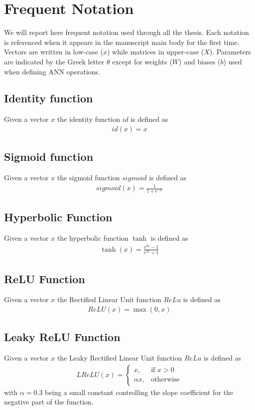 \chapter{Frequent Notation}

We will report here frequent notation used through all the thesis. Each notation is referenced when it appears in the manuscript main body for the first time. Vectors are written in low-case ($x$) while matrices in upper-case ($X$). Parameters are indicated by the Greek letter $\theta$ except for weights ($W$) and biases ($b$) used when defining ANN operations.

\section{Identity function}
Given a vector $x$ the identity function $id$ is defined as 
\begin{gather}
    \label{identity}
    id(x) = x
\end{gather}

\section{Sigmoid function}
Given a vector $x$ the sigmoid function $sigmoid$ is defined as 
\begin{gather}
    \label{sigmoid}
    sigmoid(x) = \frac {1} {1 + e^{-x}}
\end{gather}

\section{Hyperbolic Function}
Given a vector $x$ the hyperbolic function $\tanh$ is defined as 
\begin{gather}
    \label{tanh}
    \tanh(x) = \frac {e^{2x} -1} {e^{2x} +1}
\end{gather}

\section{ReLU Function}
Given a vector $x$ the Rectified Linear Unit function $ReLu$ is defined as 
\begin{gather}
    \label{relu}
    ReLU(x) = \max(0, x)
\end{gather}

\section{Leaky ReLU Function}
Given a vector $x$ the Leaky Rectified Linear Unit function $ReLu$ is defined as 
\begin{gather}
    \label{lelu}
    LReLU(x) =
    \begin{cases}
        x,& \text{if } x > 0 \\
        \alpha x,              & \text{otherwise}
    \end{cases}
\end{gather}
with $\alpha=0.3$ being a small constant controlling the slope coefficient for the negative part of the function.

